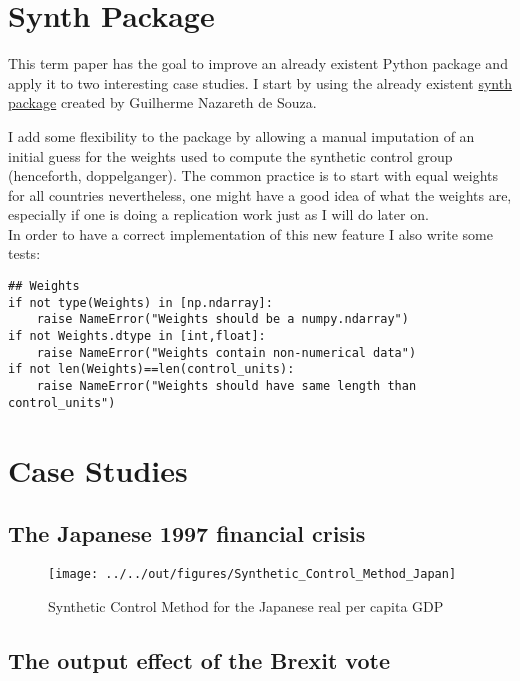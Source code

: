 \documentclass[11pt, a4paper, leqno]{article}
\begin{document}
\section{Synth Package} %
\label{synth}

This term paper has the goal to improve an already existent Python package and apply it to two interesting case studies. I start by using the already existent \href{https://github.com/gnazareths/synth}{synth package} created by Guilherme Nazareth de Souza. 




I add some flexibility to the package by allowing a manual imputation of an initial guess for the weights used to compute the synthetic control group (henceforth, doppelganger). The common practice is to start with equal weights for all countries nevertheless, one might have a good idea of what the weights are, especially if one is doing a replication work just as I will do later on.\\

In order to have a correct implementation of this new feature I also write some tests: 
\begin{lstlisting}
## Weights
if not type(Weights) in [np.ndarray]:
    raise NameError("Weights should be a numpy.ndarray")
if not Weights.dtype in [int,float]:
    raise NameError("Weights contain non-numerical data")
if not len(Weights)==len(control_units):
    raise NameError("Weights should have same length than control_units")
\end{lstlisting}



\section{Case Studies}

\subsection{The Japanese 1997 financial crisis}
\label{Japan}


\begin{figure} [h]
    \caption{Synthetic Control Method for the Japanese real per capita GDP}
    
    \texttt{[image: ../../out/figures/Synthetic\_Control\_Method\_Japan]}

\end{figure}

\subsection{The output effect of the Brexit vote}
\label{Brexit}
\end{document}
